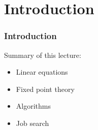


\subtitle{Prelude to Dynamic Programming}

\author{John Stachurski}

\date{September 2022}




\begin{frame}
  \titlepage
\end{frame}


\section{Introduction}


\begin{frame}
    \frametitle{Introduction}

    Summary of this lecture:

    \begin{itemize}
        \item Linear equations
            \vspace{0.3em}
        \item Fixed point theory
            \vspace{0.3em}
        \item Algorithms
            \vspace{0.3em}
        \item Job search
    \end{itemize}

            \vspace{0.3em}
            \vspace{0.3em}


\end{frame}



